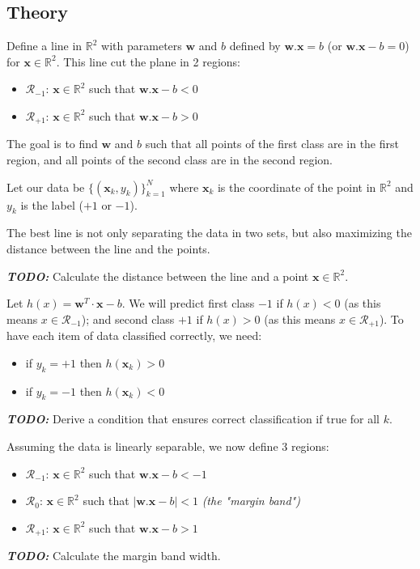 \documentclass[]{article}
\newcommand{\R}{\mathbb{R}}
\begin{document}
	\subsection{Theory}
	Define a line in $\R^2$ with parameters $\mathbf{w}$ and $b$ defined by $\mathbf{w}.\mathbf{x} = b$ (or $\mathbf{w}.\mathbf{x} - b = 0$) for $\mathbf{x} \in \R^2$.
	This line cut the plane in 2 regions:
	\begin{itemize}
		\item $\mathcal{R}_{-1}$: $\mathbf{x} \in \R^2$ such that $\mathbf{w}.\mathbf{x} - b < 0$
		\item $\mathcal{R}_{+1}$: $\mathbf{x} \in \R^2$ such that $\mathbf{w}.\mathbf{x} - b > 0$
	\end{itemize}
	The goal is to find $\mathbf{w}$ and $b$ such that all points of the first class are in the first region, and all points of the second class are in the second region.
	
	Let our data be $\{ (\mathbf{x}_k, y_k) \}_{k=1}^N$ where $\mathbf{x}_k$ is the coordinate of the point in $\R^2$ and $y_k$ is the label ($+1$ or $-1$).
	
	The best line is not only separating the data in two sets, but also maximizing the distance between the line and the points.
	
	\noindent \textbf{\textit{TODO:}}
	Calculate the distance between the line and a point $\mathbf{x} \in \R^2$.
	
	\vspace{0.5cm}
	
	Let $h(x) = \mathbf{w}^T\cdot\mathbf{x} - b$.
	We will predict first class $-1$ if $h(x)<0$ (as this means $x \in \mathcal{R}_{-1}$); and second class $+1$ if $h(x)>0$ (as this means $x \in \mathcal{R}_{+1}$).
	To have each item of data classified correctly, we need:
	\begin{itemize}
		\item if $y_k = +1$ then $h(\mathbf{x}_k)>0$
		\item if $y_k = -1$ then $h(\mathbf{x}_k)<0$
	\end{itemize}
	\noindent \textbf{\textit{TODO:}}
	Derive a condition that ensures correct classification if true for all $k$.
	
	\vspace{0.5cm}
	
	Assuming the data is linearly separable, we now define 3 regions:
	\begin{itemize}
		\item $\mathcal{R}_{-1}$: $\mathbf{x} \in \R^2$ such that $\mathbf{w}.\mathbf{x} - b < -1$
		\item $\mathcal{R}_{ 0}$: $\mathbf{x} \in \R^2$ such that $\mid \mathbf{w}.\mathbf{x} - b \mid < 1$ \textit{(the "margin band")}
		\item $\mathcal{R}_{+1}$: $\mathbf{x} \in \R^2$ such that $\mathbf{w}.\mathbf{x} - b > 1$
	\end{itemize}
	\noindent \textbf{\textit{TODO:}}
	Calculate the margin band width.
	
\end{document}

